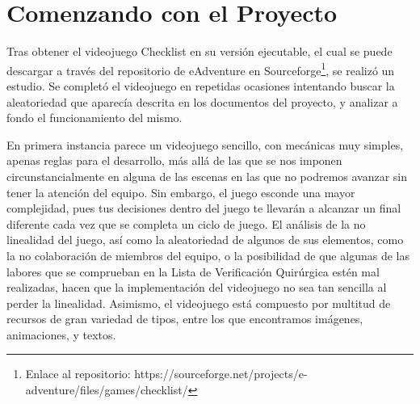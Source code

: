 
\cleardoublepage


\chapter{Comenzando con el Proyecto}
\label{comenzando}

Tras obtener el videojuego Checklist en su versión ejecutable, el cual se puede descargar a través del repositorio de eAdventure en Sourceforge\footnote{Enlace al repositorio: https://sourceforge.net/projects/e-adventure/files/games/checklist/}, se realizó un estudio. Se completó el videojuego en repetidas ocasiones intentando buscar la aleatoriedad que aparecía descrita en los documentos del proyecto, y analizar a fondo el funcionamiento del mismo. 

En primera instancia parece un videojuego sencillo, con mecánicas muy simples, apenas reglas para el desarrollo, más allá de las que se nos imponen circunstancialmente en alguna de las escenas en las que no podremos avanzar sin tener la atención del equipo. Sin embargo, el juego esconde una mayor complejidad, pues tus decisiones dentro del juego te llevarán a alcanzar un final diferente cada vez que se completa un ciclo de juego. El análisis de la no linealidad del juego, así como la aleatoriedad de algunos de sus elementos, como la no colaboración de miembros del equipo, o la posibilidad de que algunas de las labores que se comprueban en la Lista de Verificación Quirúrgica estén mal realizadas, hacen que la implementación del videojuego no sea tan sencilla al perder la linealidad. Asimismo, el videojuego está compuesto por multitud de recursos de gran variedad de tipos, entre los que encontramos imágenes, animaciones, y textos. 

